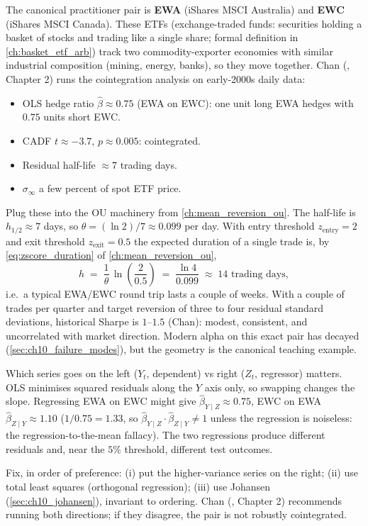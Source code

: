 The canonical practitioner pair is \textbf{EWA} (iShares MSCI
Australia) and \textbf{EWC} (iShares MSCI Canada). These ETFs
(exchange-traded funds: securities holding a basket of stocks and
trading like a single share; formal definition in
\cref{ch:basket_etf_arb}) track two commodity-exporter economies
with similar industrial composition (mining, energy, banks), so
they move together. Chan (\citeChan{}, Chapter 2) runs the
cointegration analysis on early-2000s daily data:
\begin{itemize}
  \item OLS hedge ratio $\hat\beta \approx 0.75$ (EWA on EWC): one
  unit long EWA hedges with $0.75$ units short EWC.
  \item CADF $t \approx -3.7$, $p \approx 0.005$: cointegrated.
  \item Residual half-life $\approx 7$ trading days.
  \item $\sigma_\infty$ a few percent of spot ETF price.
\end{itemize}
Plug these into the OU machinery from
\cref{ch:mean_reversion_ou}. The half-life is
$h_{1/2} \approx 7$ days, so $\theta = (\ln 2)/7 \approx 0.099$
per day. With entry threshold $z_{\text{entry}} = 2$ and exit
threshold $z_{\text{exit}} = 0.5$ the expected duration of a
single trade is, by \eqref{eq:zscore_duration} of
\cref{ch:mean_reversion_ou},
\begin{equation}
  h \;=\; \frac{1}{\theta}\,\ln\!\left(\frac{2}{0.5}\right)
       \;=\; \frac{\ln 4}{0.099}
       \;\approx\; 14 \text{ trading days},
  \label{eq:ewa_ewc_duration}
\end{equation}
i.e.\ a typical EWA/EWC round trip lasts a couple of weeks. With
a couple of trades per quarter and target reversion of three to
four residual standard deviations, historical Sharpe is
$1$--$1.5$ (Chan): modest, consistent, and uncorrelated with
market direction. Modern alpha on this exact pair has decayed
(\cref{sec:ch10_failure_modes}), but the geometry is the canonical
teaching example.

\begin{pitfallbox}
\label{pitfall:asymmetric}
Which series goes on the left ($Y_t$, dependent) vs right ($Z_t$,
regressor) matters. OLS minimises squared residuals along the $Y$
axis only, so swapping changes the slope. Regressing EWA on EWC
might give $\hat\beta_{Y\mid Z} \approx 0.75$, EWC on EWA
$\hat\beta_{Z\mid Y} \approx 1.10$ ($1/0.75 = 1.33$, so
$\hat\beta_{Y\mid Z}\cdot\hat\beta_{Z\mid Y} \neq 1$ unless the
regression is noiseless: the regression-to-the-mean fallacy).
The two regressions produce different residuals and, near the $5\%$
threshold, different test outcomes.

Fix, in order of preference: (i) put the higher-variance series on
the right; (ii) use total least squares (orthogonal regression);
(iii) use Johansen (\cref{sec:ch10_johansen}), invariant to
ordering. Chan (\citeChan{}, Chapter 2) recommends running both
directions; if they disagree, the pair is not robustly cointegrated.
\end{pitfallbox}

